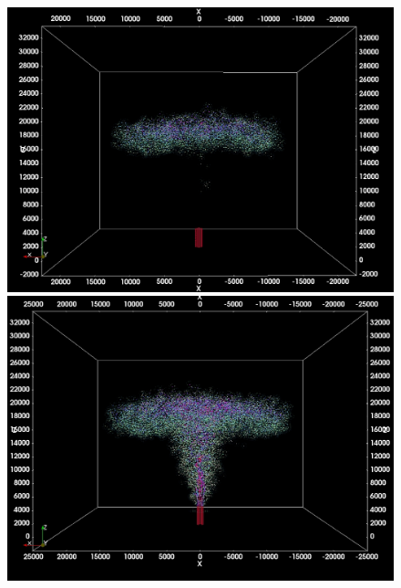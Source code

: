 \begin{figure}
\begin{minipage}{.33 \textwidth}
        \includegraphics[width=0.99 \textwidth]{Chapter-6/Figures/ShortErupt/Erupt100_t300}
    \end{minipage}%
    \begin{minipage}{.33 \textwidth}
        \centering
        \includegraphics[width=0.99 \textwidth]{Chapter-6/Figures/ShortErupt/Erupt300_t300}
    \end{minipage}%
    \\
    \begin{minipage}{.33\textwidth}
        \centering

\end{minipage}
\end{figure}
